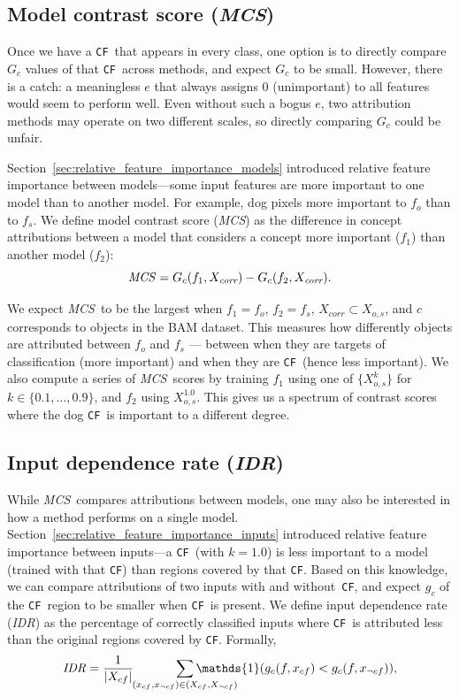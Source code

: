 \documentclass[twoside]{article}
\newcommand{\CF}{\texttt{CF}}
\newcommand{\MCS}{\textit{MCS}}
\newcommand{\IDR}{\textit{IDR}}
\begin{document}
\subsection{Model contrast score (\MCS)} \label{sec:model_dependence}
Once we have a \CF~that appears in every class, one option is to directly compare $G_c$ values of that \CF~across methods, and expect $G_c$ to be small. However, there is a catch: a meaningless $e$ that always assigns 0 (unimportant) to all features would seem to perform well. Even without such a bogus $e$, two attribution methods may operate on two different scales, so directly comparing $G_c$ could be unfair. 

Section~\ref{sec:relative_feature_importance_models} introduced relative feature importance between models---some input features are more important to one model than to another model. For example, dog pixels more important to $f_o$ than to $f_s$. We define model contrast score (\MCS) as the difference in concept attributions between a model that considers a concept more important ($f_1$) than another model ($f_2$):
$$
\textrm{\MCS} = G_c(f_1, X_{\textit{corr}}) - G_c(f_2, X_{\textit{corr}}).
$$

We expect \MCS~to be the largest when $f_1 = f_o$, $f_2 = f_s$, $X_{\textit{corr}} \subset X_{o,s}$, and $c$ corresponds to objects in the BAM dataset. This measures how differently objects are attributed between $f_o$ and $f_s$ --- between when they are targets of classification (more important) and when they are \CF~(hence less important). We also compute a series of \MCS~scores by training $f_1$ using one of $\{X_{o,s}^k\}$ for $k \in \{0.1, \dots, 0.9\}$, and $f_2$ using $X_{o,s}^{1.0}$. This gives us a spectrum of contrast scores where the dog \CF~is important to a different degree.

\subsection{Input dependence rate (\IDR)}
While \MCS~compares attributions between models, one may also be interested in how a method performs on a single model. Section~\ref{sec:relative_feature_importance_inputs} introduced relative feature importance between inputs---a \CF~(with $k=1.0$) is less important to a model (trained with that \CF) than regions covered by that \CF. Based on this knowledge, we can compare attributions of two inputs with and without~\CF, and expect $g_c$ of the \CF~region to be smaller when \CF~is present. We define input dependence rate (\IDR) as the percentage of correctly classified inputs where \CF~is attributed less than the original regions covered by \CF. Formally,
$$ \textrm{\IDR} = \frac{1}{|X_{cf}|}\qquad \quad \; \sum\limits_{\mathclap{(x_{cf}, x_{\neg cf}) \in (X_{cf}, X_{\neg cf})}}{\mathds{1}(g_{c}(f, x_{cf}) < g_{c}(f, x_{\neg cf})}),$$
\end{document}

